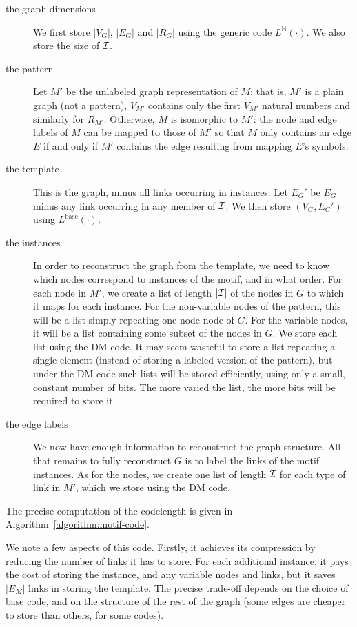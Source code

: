 \documentclass[11pt]{article}
\newcommand{\N}{{\mathbb N}}
\newcommand{\I}{{\cal I}}
\begin{document}
\begin{description}
 \item[the graph dimensions] We first store $|V_G|$, $|E_G|$ and $|R_G|$ using the generic code $L^{\N}(\cdot)$. We also store the size of $\I$.
 \item[the pattern] Let $M'$ be the unlabeled graph representation of $M$: that is, $M'$ is a plain graph (not a pattern), $V_{M'}$ contains only the first $V_{M'}$ natural numbers and similarly for $R_{M'}$. Otherwise, $M$ is isomorphic to $M'$: the node and edge labels of $M$ can be mapped to those of $M'$ so that $M$ only contains an edge $E$ if and only if $M'$ contains the edge resulting from mapping $E$'s symbols. 
 \item[the template] This is the graph, minus all links occurring in  instances. Let $E_G'$ be $E_G$ minus any link occurring in any member of $\cal I$. We then store $(V_G, E_G')$ using $L^\text{base}(\cdot)$.
 \item[the instances] In order to reconstruct the graph from the template, we need to know which nodes correspond to instances of the motif, and in what order. For each node in $M'$, we create a list of length $\cal |I|$ of the nodes in $G$ to which it maps for each instance. For the non-variable nodes of the pattern, this will be a list simply repeating one node node of $G$. For the variable nodes, it will be a list containing some subset of the nodes in $G$.
 We store each list using the DM code. It may seem wasteful to store a list repeating a single element (instead of storing a labeled version of the pattern), but under the DM code such lists will be stored efficiently, using only a small, constant number of bits. The more varied the list, the more bits will be required to store it.
 \item[the edge labels] We now have enough information to reconstruct the graph structure. All that remains to fully reconstruct $G$ is to label the links of the motif instances. As for the nodes, we create one list of length $\cal I$ for each type of link in $M'$, which we store using the DM code.
\end{description}

The precise computation of the codelength is given in Algorithm~\ref{algorithm:motif-code}. 

We note a few aspects of this code. Firstly, it achieves its compression by reducing the number of links it has to store. For each additional instance, it pays the cost of storing the instance, and any variable nodes and links, but it saves $|E_M|$ links in storing the template. The precise trade-off depends on the choice of base code, and on the structure of the rest of the graph (some edges are cheaper to store than others, for some codes).
\end{document}
